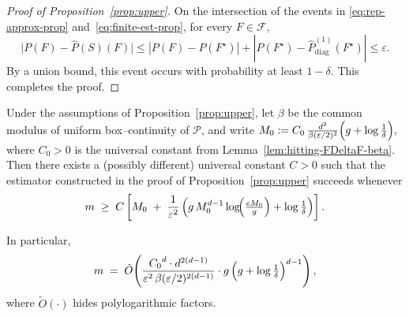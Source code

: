 \documentclass[arxiv]{colt2026}
\newcommand{\F}{\mathcal{F}}
\newcommand{\Pc}{\mathcal{P}}
\newcommand{\eps}{\varepsilon}
\newcommand{\diag}{\mathrm{diag}}
\begin{document}
\begin{proof}[Proof of Proposition~\ref{prop:upper}]
On the intersection of the events in
\eqref{eq:rep-approx-prop} and~\eqref{eq:finite-est-prop},
for every $F\in\F$,
\[
\bigl|P(F)-\widehat P(S)(F)\bigr|
\le |P(F)-P(F^\star)|
+|P(F^\star)-\widehat P_{\diag}^{(1)}(F^\star)|
\le \eps.
\]
By a union bound, this event occurs with probability at least $1-\delta.$
This completes the proof.
\end{proof}
\begin{lemma}
\label{lem:m-bound-prop1}
Under the assumptions of Proposition~\ref{prop:upper}, let $\beta$ be the common
modulus of uniform box--continuity of $\Pc$, and write
$M_0:=C_0\,\frac{d^2}{\beta(\eps/2)^2}\Bigl(g+\log\tfrac{1}{\delta}\Bigr),$
where $C_0>0$ is the universal constant from
Lemma~\ref{lem:hitting-FDeltaF-beta}.
Then there exists a (possibly different) universal constant $C>0$ such that the
estimator constructed in the proof of Proposition~\ref{prop:upper} succeeds
whenever
\[
m
\;\ge\;
C\left[
M_0
\;+\;
\frac{1}{\eps^2}
\left(
g\,M_0^{d-1}\log\!\Bigl(\tfrac{eM_0}{g}\Bigr)
+
\log\tfrac{1}{\delta}
\right)
\right].
\]

In particular,
\[
m
\;=\;
\tilde O\!\left(
\frac{{C_0}^d \cdot d^{2(d-1)}}{\eps^2\,\beta(\eps/2)^{2(d-1)}}
\cdot 
g\,
\Bigl(g+\log\tfrac{1}{\delta}\Bigr)^{d-1}
\right),
\]
where $\tilde O(\cdot)$ hides polylogarithmic factors.
\end{lemma}
\end{document}
